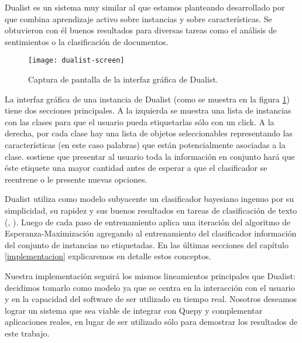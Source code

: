 Dualist es un sistema muy similar al que estamos planteando desarrollado por \citet{dualist} que combina aprendizaje activo sobre instancias y sobre características. Se obtuvieron con él buenos resultados para diversas tareas como el análisis de sentimientos o la clasificación de documentos.

\begin{figure}[h!]
\caption{Captura de pantalla de la interfaz gráfica de Dualist.}\label{figura-dualist}
\texttt{[image: dualist-screen]}
\centering
\end{figure}

La interfaz gráfica de una instancia de Dualist (como se muestra en la figura \ref{figura-dualist}) tiene dos secciones principales. A la izquierda se muestra una lista de instancias con las clases para que el usuario pueda etiquetarlas sólo con un click. A la derecha, por cada clase hay una lista de objetos seleccionables representando las características (en este caso palabras) que están potencialmente asociadas a la clase. \citet{dualist} sostiene que presentar al usuario toda la información en conjunto hará que éste etiquete una mayor cantidad antes de esperar a que el clasificador se reentrene o le presente nuevas opciones.

Dualist utiliza como modelo subyacente un clasificador bayesiano ingenuo por su simplicidad, su rapidez y sus buenos resultados en tareas de clasificación de texto (\citet{multinomialnb-comparision-mccallum}, \citet{tackling-mnb}). Luego de cada paso de entrenamiento aplica una iteración del algoritmo de Esperanza-Maximización agregando al entrenamiento del clasificador información del conjunto de instancias no etiquetadas. En las últimas secciones del capítulo \ref{implementacion} explicaremos en detalle estos conceptos.

Nuestra implementación seguirá los mismos lineamientos principales que Dualist: decidimos tomarlo como modelo ya que se centra en la interacción con el usuario y en la capacidad del software de ser utilizado en tiempo real. Nosotros deseamos lograr un sistema que sea viable de integrar con Quepy y complementar aplicaciones reales, en lugar de ser utilizado sólo para demostrar los resultados de este trabajo.

